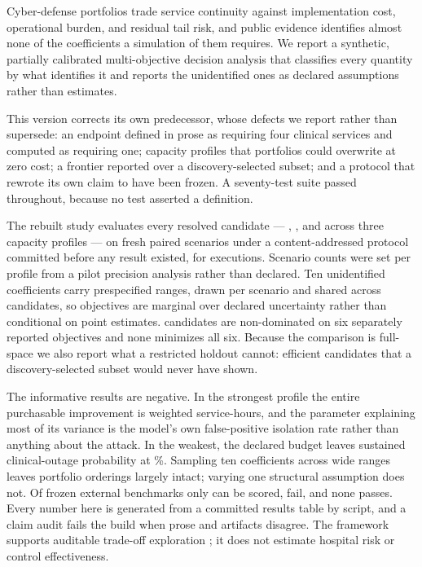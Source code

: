 Cyber-defense portfolios trade service continuity against implementation
cost, operational burden, and residual tail risk, and public evidence
identifies almost none of the coefficients a simulation of them requires. We
report a synthetic, partially calibrated multi-objective decision analysis
that classifies every quantity by what identifies it and reports the
unidentified ones as declared assumptions rather than estimates.

This version corrects its own predecessor, whose defects we report rather
than supersede: an endpoint defined in prose as requiring four clinical
services and computed as requiring one; capacity profiles that portfolios
could overwrite at zero cost; a frontier reported over a discovery-selected
subset; and a protocol that rewrote its own claim to have been frozen. A
seventy-test suite passed throughout, because no test asserted a definition.

The rebuilt study evaluates every resolved candidate ---
\ConfirmResourceConstrainedCandidates{}, \ConfirmIntermediateCandidates{},
and \ConfirmHighCapacityCandidates{} across three capacity profiles --- on
fresh paired scenarios under a content-addressed protocol committed before
any result existed, for \ConfirmTotalExecutions{} executions. Scenario counts
were set per profile from a pilot precision analysis rather than declared.
Ten unidentified coefficients carry prespecified ranges, drawn per scenario
and shared across candidates, so objectives are marginal over declared
uncertainty rather than conditional on point estimates.
\ConfirmFullSpaceFrontier{} candidates are non-dominated on six separately
reported objectives and none minimizes all six. Because the comparison is
full-space we also report what a restricted holdout cannot:
\ConfirmNonFinalistsOnFrontier{} efficient candidates that a
discovery-selected subset would never have shown.

The informative results are negative. In the strongest profile the entire
purchasable improvement is \ConfirmHighCapacityMaxPurchasableImprovement{}
weighted service-hours, and the parameter explaining most of its variance is
the model's own false-positive isolation rate rather than anything about the
attack. In the weakest, the declared budget leaves sustained clinical-outage
probability at \ConfirmResourceConstrainedBestAffordableOutage\%. Sampling
ten coefficients across wide ranges leaves portfolio orderings largely
intact; varying one structural assumption does not. Of
\ValidationBenchmarks{} frozen external benchmarks only \ValidationScored{}
can be scored, \ValidationFailed{} fail, and none passes. Every number here is generated
from a committed results table by script, and a claim audit fails the build
when prose and artifacts disagree. The framework supports auditable
trade-off exploration \modelonly; it does not estimate hospital risk or
control effectiveness.

